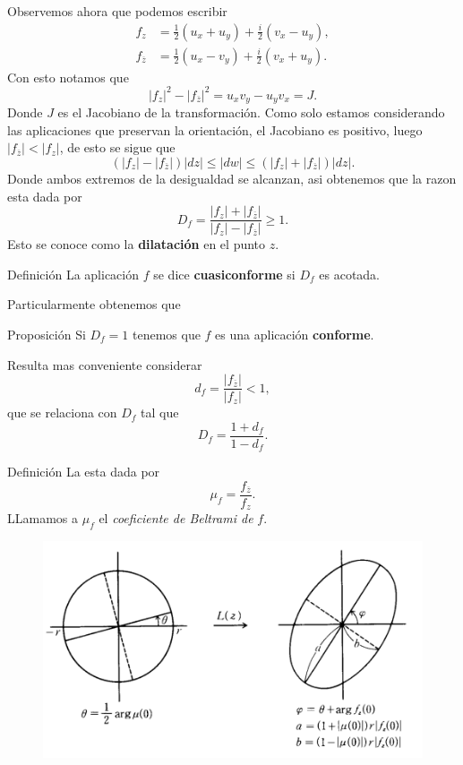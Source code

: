 \documentclass[xcolor=dvipsnames,10pt]{beamer}
\begin{document}
\begin{frame}
    Observemos ahora que podemos escribir
    \begin{align*}
        f_z&=\frac{1}{2}(u_x+u_y)+\frac{i}{2}(v_x-u_y),\\
        f_{\overline{z}}&=\frac{1}{2}(u_x-v_y)+\frac{i}{2}(v_x+u_y).
    \end{align*}
    Con esto notamos que
    $$|f_z|^2-|f_{\overline{z}}|^2=u_xv_y-u_yv_x=J.$$
    Donde $J$ es el Jacobiano de la transformación. Como solo estamos considerando las aplicaciones que preservan la orientación, el Jacobiano es positivo, luego $|f_{\overline{z}}|<|f_z|$, de esto se sigue que
    $$(|f_z|-|f_{\overline{z}}|)|dz|\leq |dw|\leq (|f_z|+|f_{\overline{z}}|)|dz|.$$
    Donde ambos extremos de la desigualdad se alcanzan, asi obtenemos que la razon esta dada por
    $$D_f=\frac{|f_z|+|f_{\overline{z}}|}{|f_z|-|f_{\overline{z}}|}\geq 1.$$
    Esto se conoce como la \textbf{dilatación} en el punto $z$.
\end{frame}

\begin{frame}
    \begin{block}{Definición}
        La aplicación $f$ se dice \textbf{cuasiconforme} si $D_f$ es acotada.
        \end{block}
        Particularmente obtenemos que
\begin{block}{Proposición}
Si $D_f=1$ tenemos que $f$ es una aplicación \textbf{conforme}.
\end{block}
Resulta mas conveniente considerar
    $$d_f=\frac{|f_{\overline{z}}|}{|f_z|}<1,$$
    que se relaciona con $D_f$ tal que
    $$D_f=\frac{1+d_f}{1-d_f}.$$
\end{frame}
\begin{frame}
    \begin{block}{Definición}
        La  esta dada por
        $$\mu_f=\frac{f_{\overline{z}}}{f_z}.$$
        LLamamos a $\mu_f$ el \textit{coeficiente de Beltrami de }$f.$
    \end{block}
    \begin{figure}
            \centering
            \includegraphics[width=0.5\linewidth]{Imagenes/Semieje.png}
        \end{figure}
\end{frame}
\end{document}
